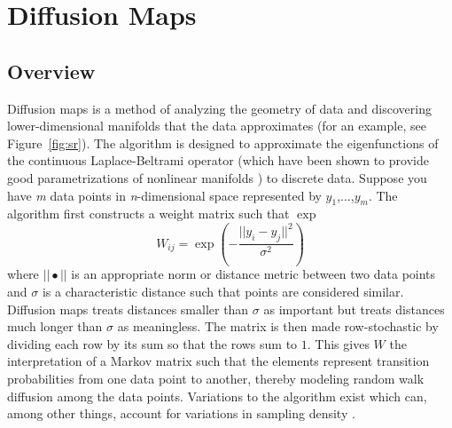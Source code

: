 \documentclass[12pt]{article}
\begin{document}
\section{Diffusion Maps}

\subsection{Overview} \label{DMO}

Diffusion maps is a method of analyzing the geometry of data and discovering lower-dimensional manifolds that the data approximates (for an example, see Figure~\ref{fig:sr}). The algorithm is designed to approximate the eigenfunctions of the continuous Laplace-Beltrami operator (which have been shown to provide good parametrizations of nonlinear manifolds \cite{Jones2008}) to discrete data. Suppose you have \textit{m} data points in \textit{n}-dimensional space represented by $y_1$,...,$y_\textit{m}$. The algorithm first constructs a weight matrix such that $\exp$\\
\[
W_{ij}=\exp{\left(-\frac{||y_i-y_j||^2}{\sigma ^2}\right)}
\]
where $|| \bullet ||$ is an appropriate norm or distance metric between two data points and $\sigma$ is a characteristic distance such that points are considered similar. Diffusion maps treats distances smaller than $\sigma$ as important but treats distances much longer than $\sigma$ as meaningless. The matrix is then made row-stochastic by dividing each row by its sum so that the rows sum to $1$. This gives $W$ the interpretation of a Markov matrix such that the elements represent transition probabilities from one data point to another, thereby modeling random walk diffusion among the data points. Variations to the algorithm exist which can, among other things, account for variations in sampling density \cite{Coifman2006}.\vspace{1mm}
\end{document}
